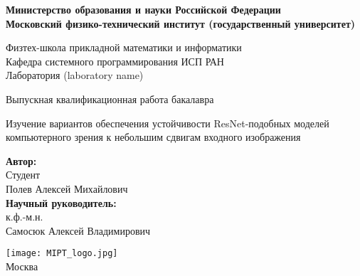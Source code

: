 \begin{center}
    \large\textbf{Министерство образования и науки Российской Федерации \\
    Московский физико-технический институт (государственный
    университет)} \\
    \vspace{1cm}

    Физтех-школа прикладной математики и информатики \\

    Кафедра системного программирования ИСП РАН \\
    Лаборатория (laboratory name)\\

    \vspace{3em}

    Выпускная квалификационная работа бакалавра
\end{center}

\begin{center}
    \vspace{\fill}
    \Large{Изучение вариантов обеспечения устойчивости ResNet-подобных моделей компьютерного зрения к небольшим сдвигам входного изображения}

    \vspace{\fill}
\end{center}


\begin{flushright}
    \textbf{Автор:} \\
    Студент \\
    Полев Алексей Михайлович \\
    \vspace{2em}
    \textbf{Научный руководитель:} \\
    к.ф.-м.н. \\
    Самосюк Алексей Владимирович \\
\end{flushright}

\vspace{7em}

\begin{center}
    \texttt{[image: MIPT\_logo.jpg]}\\
    Москва \the\year{}
\end{center}

\thispagestyle{empty}

\newpage
\setcounter{page}{2}
\fancyfoot[c]{\thepage}
\fancyhead[R]{}